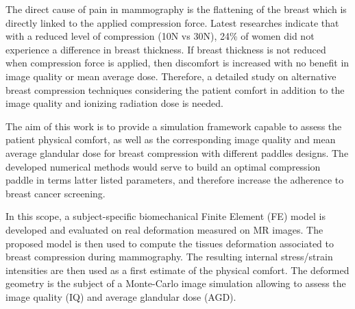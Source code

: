 The direct cause of pain in mammography is the flattening of the breast which is directly linked to the applied compression force. Latest researches indicate that with a reduced level of compression (10N vs 30N), 24\% of women did not experience a difference in breast thickness. If breast thickness is not reduced when compression force is applied, then discomfort is increased with no benefit in image quality or mean average dose. Therefore, a detailed study on alternative breast compression techniques considering the patient comfort in addition to the image quality and ionizing radiation dose is needed.

The aim of this work is to provide a simulation framework capable to assess the patient physical comfort, as well as the corresponding image quality and mean average glandular dose for breast compression with different paddles designs. The developed numerical methods would serve to build an optimal compression paddle in terms latter listed parameters, and therefore increase the adherence to breast cancer screening. 

In this scope, a subject-specific biomechanical Finite Element (FE) model is developed and evaluated on real deformation measured on MR images. The proposed model is then used to compute the tissues deformation associated to breast compression during mammography.  The resulting internal stress/strain intensities are then used as a first estimate of the physical comfort. The deformed geometry is the subject of a Monte-Carlo image simulation allowing to assess the image quality (IQ) and average glandular dose (AGD).




